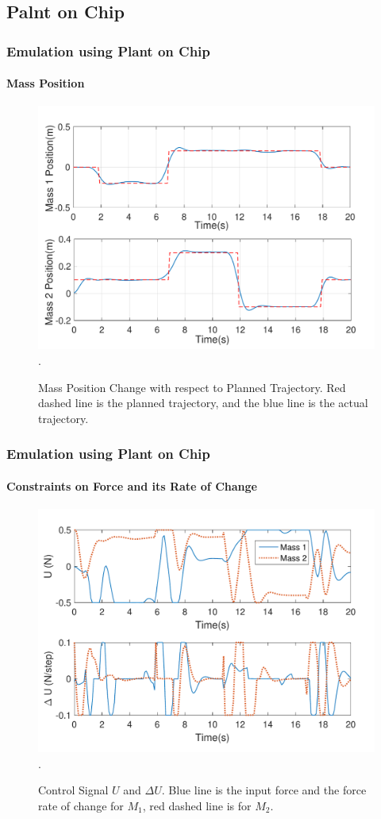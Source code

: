\documentclass{beamer}
\begin{document}
\subsection{Palnt on Chip}
\begin{frame}
\frametitle{Emulation using Plant on Chip}
\framesubtitle{Mass Position}
\begin{figure}[t]
\centering
\captionsetup{justification=centering}
\includegraphics[scale=.45]{../ASAP_17/figure/MP.pdf}
\DeclareGraphicsExtensions.
\caption{Mass Position Change with respect to Planned Trajectory. Red dashed line is the planned trajectory, and the blue line is the actual trajectory.\label{fig_mp}}
\end{figure}
\end{frame}
\begin{frame}
\frametitle{Emulation using Plant on Chip}
\framesubtitle{Constraints on Force and its Rate of Change}
\begin{figure}[t]
\centering
\captionsetup{justification=centering}
\includegraphics[scale=.45]{../ASAP_17/figure/MU.pdf}
\DeclareGraphicsExtensions.
\caption{Control Signal $U$ and $\Delta U$. Blue line is the input force and the force rate of change for $M_1$, red dashed line is for $M_2$.\label{fig_mu}}
\end{figure}
\end{frame}
\end{document}
